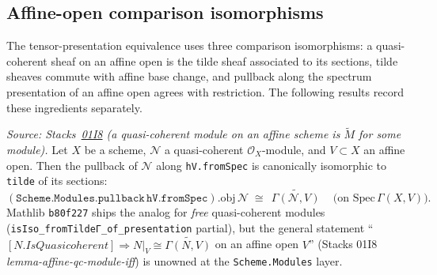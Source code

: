 \subsection{Affine-open comparison isomorphisms}
\label{sec:quot_iter189_unbundle}

The tensor-presentation equivalence uses three comparison isomorphisms:
a quasi-coherent sheaf on an affine open is the tilde sheaf associated to
its sections, tilde sheaves commute with affine base change, and pullback
along the spectrum presentation of an affine open agrees with restriction.
The following results record these ingredients separately.

\begin{lemma}\leanok
  \label{lem:tildeIso_of_isQuasicoherent_isAffineOpen}
  \textit{Source: Stacks~\href{https://stacks.math.columbia.edu/tag/01I8}{01I8}
  (a quasi-coherent module on an affine scheme is \(\widetilde M\) for
  some module).}
  Let \(X\) be a scheme, \(\mathcal N\) a quasi-coherent
  \(\mathcal O_X\)-module, and \(V \subset X\) an affine open. Then the
  pullback of \(\mathcal N\) along \texttt{hV.fromSpec} is canonically
  isomorphic to \texttt{tilde} of its sections:
  \[
    (\mathtt{Scheme.Modules.pullback}\,\mathtt{hV.fromSpec}).\mathrm{obj}\,
      \mathcal N
    \;\cong\;
    \widetilde{\,\Gamma(\mathcal N, V)\,}
    \quad\text{(on \(\mathrm{Spec}\,\Gamma(X, V)\)).}
  \]
  Mathlib \texttt{b80f227} ships the analog for \emph{free}
  quasi-coherent modules (\texttt{isIso\_fromTildeΓ\_of\_presentation}
  partial), but the general statement
  ``\([N.IsQuasicoherent] \Rightarrow N|_V \cong \widetilde{\Gamma(N,V)}\)
  on an affine open \(V\)'' (Stacks 01I8 \emph{lemma-affine-qc-module-iff})
  is unowned at the \texttt{Scheme.Modules} layer.
\end{lemma}

